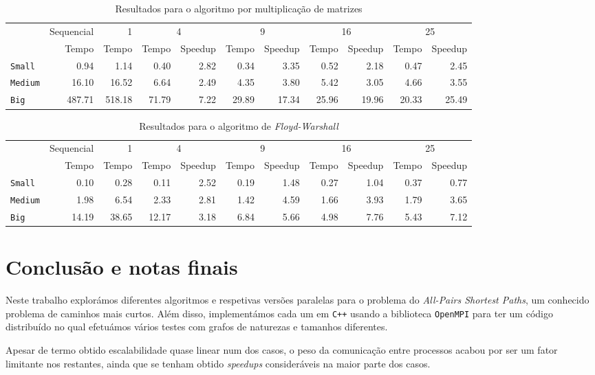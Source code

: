 \documentclass[10pt,a4paper,oneside]{article}
\begin{document}
\begin{table}[t]
  \caption{Resultados para o algoritmo por multiplicação de matrizes}
  \label{tbl:tbl4}
  \begin{tabular}{|l|r|r|r|r|r|r|r|r|r|r|}
    \hline
    & Sequencial & 1 & \multicolumn{2}{c|}{4} & \multicolumn{2}{c|}{9} & \multicolumn{2}{c|}{16} & \multicolumn{2}{c|}{25} \\ \cline{2-11}
    & Tempo & Tempo & Tempo & Speedup & Tempo & Speedup & Tempo & Speedup & Tempo & Speedup \\ \hline
    {\tt Small} & 0.94 & 1.14 & 0.40 & 2.82 & 0.34 & 3.35 & 0.52 & 2.18 & 0.47 & 2.45 \\ \hline
    {\tt Medium} & 16.10 & 16.52 & 6.64 & 2.49 & 4.35 & 3.80 & 5.42 & 3.05 & 4.66 & 3.55 \\ \hline
    {\tt Big} & 487.71 & 518.18 & 71.79 & 7.22 & 29.89 & 17.34 & 25.96 & 19.96 & 20.33 & 25.49 \\ \hline
  \end{tabular}
\end{table}

\begin{table}[b]
  \caption{Resultados para o algoritmo de \textit{Floyd-Warshall}}
  \label{tbl:tbl5}
  \begin{tabular}{|l|r|r|r|r|r|r|r|r|r|r|}
    \hline
    & Sequencial & 1 & \multicolumn{2}{c|}{4} & \multicolumn{2}{c|}{9} & \multicolumn{2}{c|}{16} & \multicolumn{2}{c|}{25} \\ \cline{2-11}
    & Tempo & Tempo & Tempo & Speedup & Tempo & Speedup & Tempo & Speedup & Tempo & Speedup \\ \hline
    {\tt Small} & 0.10 & 0.28 & 0.11 & 2.52 & 0.19 & 1.48 & 0.27 & 1.04 & 0.37 & 0.77 \\ \hline
    {\tt Medium} & 1.98 & 6.54 & 2.33 & 2.81 & 1.42 & 4.59 & 1.66 & 3.93 & 1.79 & 3.65 \\ \hline
    {\tt Big} & 14.19 & 38.65 & 12.17 & 3.18 & 6.84 & 5.66 & 4.98 & 7.76 & 5.43 & 7.12 \\ \hline
  \end{tabular}
\end{table}



\section{Conclusão e notas finais}
\label{sec:con}
Neste trabalho explorámos diferentes algoritmos e respetivas versões
paralelas para o problema do \textit{All-Pairs Shortest Paths}, um
conhecido problema de caminhos mais curtos. Além disso, implementámos
cada um em {\tt C++} usando a biblioteca {\tt OpenMPI} para ter um
código distribuído no qual efetuámos vários testes com grafos de
naturezas e tamanhos diferentes.

Apesar de termo obtido escalabilidade quase linear num dos casos, o
peso da comunicação entre processos acabou por ser um fator limitante
nos restantes, ainda que se tenham obtido \textit{speedups}
consideráveis na maior parte dos casos.



\end{document}
